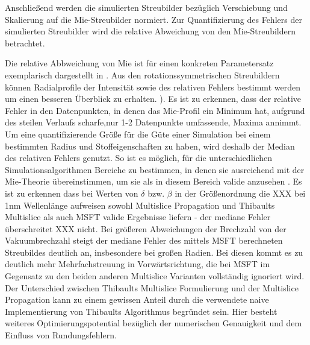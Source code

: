 Anschließend werden die simulierten Streubilder bezüglich Verschiebung und Skalierung auf die Mie-Streubilder normiert. Zur Quantifizierung des Fehlers der simulierten Streubilder wird die relative Abweichung von den Mie-Streubildern betrachtet.

Die relative Abbweichung von Mie ist für einen konkreten Parametersatz exemplarisch dargestellt in . Aus den rotationssymmetrischen Streubildern können Radialprofile der Intensität sowie des relativen Fehlers bestimmt werden um einen besseren Überblick zu erhalten. ).
Es ist zu erkennen, dass der relative Fehler in den Datenpunkten, in denen das Mie-Profil ein Minimum hat, aufgrund des steilen Verlaufs scharfe,nur 1-2 Datenpunkte umfassende, Maxima annimmt.
Um eine quantifizierende Größe für die Güte einer Simulation bei einem bestimmten Radius und Stoffeigenschaften zu haben, wird deshalb der Median des relativen Fehlers genutzt. So ist es möglich, für die unterschiedlichen Simulationsalgorithmen Bereiche zu bestimmen, in denen sie ausreichend mit der Mie-Theorie übereinstimmen, um sie als in diesem Bereich valide anzusehen . Es ist zu erkennen dass bei Werten von $\delta$ bzw. $\beta$ in der Größenordnung die XXX bei 1\si{nm} Wellenlänge aufweisen sowohl Multislice Propagation und Thibaults Multislice als auch MSFT valide Ergebnisse liefern - der mediane Fehler überschreitet XXX nicht. Bei größeren Abweichungen der Brechzahl von der Vakuumbrechzahl steigt der mediane Fehler des mittels MSFT berechneten Streubildes deutlich an, insbesondere bei großen Radien. Bei diesen kommt es zu deutlich mehr Mehrfachstreuung in Vorwärtsrichtung, die bei MSFT im Gegensatz zu den beiden anderen Multislice Varianten vollständig ignoriert wird. Der Unterschied zwischen Thibaults Multislice Formulierung und der Multislice Propagation kann zu einem gewissen Anteil durch die verwendete naive Implementierung von Thibaults Algorithmus begründet sein. Hier besteht weiteres Optimierungspotential bezüglich der numerischen Genauigkeit und dem Einfluss von Rundungsfehlern.


